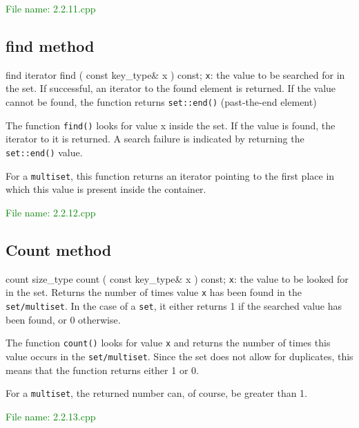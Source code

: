 \textcolor{green}{File name: 2.2.11.cpp} 
 

\subsection{find method} %
\begin{methodinfo}
  {find}
  {iterator find ( const key_type& x ) const;}
  {\texttt{x}: the value to be searched for in the set.}
  {If successful, an iterator to the found element is returned. If the value cannot be found, 
  the function returns \texttt{set::end()} (past-the-end element)}
  {The function \texttt{find()} looks for value x inside the set. If the value is found, the iterator to 
  it is returned. A search failure is indicated by returning the \texttt{set::end()} value.
  
  For a \texttt{multiset}, this function returns an iterator pointing to the first place in which this value is 
  present inside the container.}
\end{methodinfo}

\textcolor{green}{File name: 2.2.12.cpp} 
 

\subsection{Count method} %
\begin{methodinfo}
  {count}
  {size_type count ( const key_type& x ) const;}
  {\texttt{x}: the value to be looked for in the set.}
  {Returns the number of times value \texttt{x} has been found in the \texttt{set/multiset}. In the case of 
  a \texttt{set}, it either returns 1 if the searched value has been found, or 0 otherwise.}
  {The function \texttt{count()} looks for value \texttt{x} and returns the number of times this value 
  occurs in the \texttt{set/multiset}. Since the set does not allow for duplicates, this means that 
  the function returns either 1 or 0.

  For a \texttt{multiset}, the returned number can, of course, be greater than 1.}
\end{methodinfo}

\textcolor{green}{File name: 2.2.13.cpp} 
 

